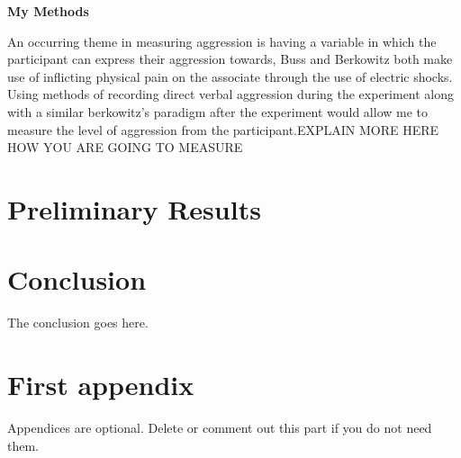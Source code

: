 \documentclass[journal]{IEEEtran}
\begin{document}
    \textbf{My Methods}
    
    An occurring theme in measuring aggression is having a variable in which the participant can express their aggression towards, Buss and Berkowitz both make use of inflicting physical pain on the associate through the use of electric shocks. Using methods of recording direct verbal aggression during the experiment along with a similar berkowitz’s paradigm after the experiment would allow me to measure the level of aggression from the participant.EXPLAIN MORE HERE HOW YOU ARE GOING TO MEASURE

\section{Preliminary Results}
\section{Conclusion}
The conclusion goes here.






\appendices
\section{First appendix}
Appendices are optional. Delete or comment out this part if you do not need them.

\end{document}

